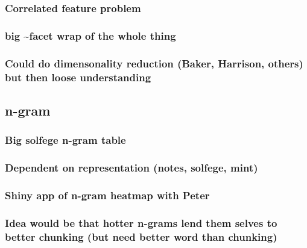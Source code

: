 \documentclass[]{book}
\theoremstyle{definition}
\theoremstyle{definition}
\theoremstyle{definition}
\theoremstyle{remark}
\begin{document}
\hypertarget{correlated-feature-problem}{%
\subsubsection{Correlated feature
problem}\label{correlated-feature-problem}}

\hypertarget{big-facet-wrap-of-the-whole-thing}{%
\subsubsection{big \textasciitilde{}facet wrap of the whole
thing}\label{big-facet-wrap-of-the-whole-thing}}

\hypertarget{could-do-dimensonality-reduction-baker-harrison-others-but-then-loose-understanding}{%
\subsubsection{Could do dimensonality reduction (Baker, Harrison,
others) but then loose
understanding}\label{could-do-dimensonality-reduction-baker-harrison-others-but-then-loose-understanding}}

\hypertarget{n-gram}{%
\subsection{n-gram}\label{n-gram}}

\hypertarget{big-solfege-n-gram-table}{%
\subsubsection{Big solfege n-gram
table}\label{big-solfege-n-gram-table}}

\hypertarget{dependent-on-representation-notes-solfege-mint}{%
\subsubsection{Dependent on representation (notes, solfege,
mint)}\label{dependent-on-representation-notes-solfege-mint}}

\hypertarget{shiny-app-of-n-gram-heatmap-with-peter}{%
\subsubsection{Shiny app of n-gram heatmap with
Peter}\label{shiny-app-of-n-gram-heatmap-with-peter}}

\hypertarget{idea-would-be-that-hotter-n-grams-lend-them-selves-to-better-chunking-but-need-better-word-than-chunking}{%
\subsubsection{Idea would be that hotter n-grams lend them selves to
better chunking (but need better word than
chunking)}\label{idea-would-be-that-hotter-n-grams-lend-them-selves-to-better-chunking-but-need-better-word-than-chunking}}
\end{document}
